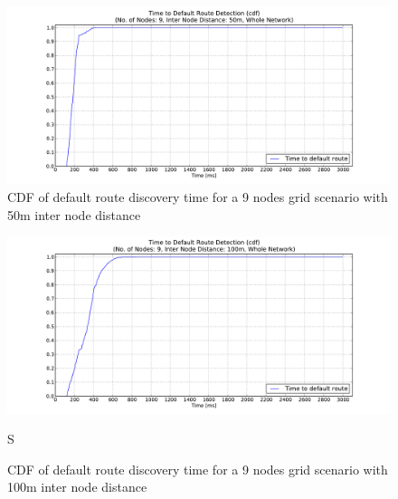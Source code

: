 \begin{figure}[htbp]
  \begin{center}
  \hspace{-20pt}
    \leavevmode
      \includegraphics[width=\textwidth]
      {Pics/results/9/MRHOF/grid/dist50_montecarlo_cdf_hist.pdf}
   \caption{CDF of default route discovery time for a 9 nodes grid scenario with 50m inter node distance}
   \label{fig:9_MRHOF_grid_50_cdf}
  \end{center}
  \vspace{-10pt}
\end{figure}

\begin{figure}[htbp]
  \begin{center}
  \hspace{-20pt}
    \leavevmode
      \includegraphics[width=\textwidth]
      {Pics/results/9/MRHOF/grid/dist100_montecarlo_cdf_hist.pdf}
   \caption{CDF of default route discovery time for a 9 nodes grid scenario with 100m inter node distance}
   \label{fig:9_MRHOF_grid_100_cdf}
  \end{center}S
  \vspace{-10pt}
\end{figure}


